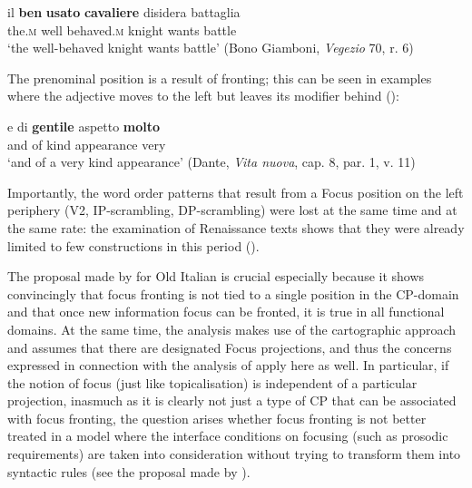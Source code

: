 \ea \gll il \textbf{ben} \textbf{usato} \textbf{cavaliere} disidera battaglia\\
the.\textsc{m} well behaved.\textsc{m} knight wants battle\\
\glt `the well-behaved knight wants battle' (Bono Giamboni, \textit{Vegezio} 70, r. 6)
\z

The prenominal position is a result of fronting; this can be seen in examples where the adjective moves to the left but leaves its modifier behind (\citealt[278, ex. 31a]{poletto2006}):

\ea \gll e di \textbf{gentile} aspetto \textbf{molto}\\
and of kind appearance very\\
\glt `and of a very kind appearance' (Dante, \textit{Vita nuova}, cap. 8, par. 1, v. 11)
\z

Importantly, the word order patterns that result from a Focus position on the left periphery (V2, IP-scrambling, DP-scrambling) were lost at the same time and at the same rate: the examination of Renaissance texts shows that they were already limited to few constructions in this period (\citealt[278--285]{poletto2006}).

The proposal made by \citet{poletto2006} for Old Italian is crucial especially because it shows convincingly that focus fronting is not tied to a single position in the CP-domain and that once new information focus can be fronted, it is true in all functional domains. At the same time, the analysis makes use of the cartographic approach and assumes that there are designated Focus projections, and thus the concerns expressed in connection with the analysis of \citet{rizzi1997, rizzi2004} apply here as well. In particular, if the notion of focus (just like topicalisation) is independent of a particular projection, inasmuch as it is clearly not just a type of CP that can be associated with focus fronting, the question arises whether focus fronting is not better treated in a model where the interface conditions on focusing (such as prosodic requirements) are taken into consideration without trying to transform them into syntactic rules (see the proposal made by \citealt{fanselowlenertova2011}).

